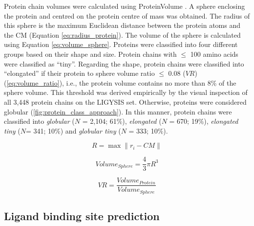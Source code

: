 Protein chain volumes were calculated using ProteinVolume \cite{CHEN_2015_PROTEINVOLUME}. A sphere enclosing the protein and centred on the protein centre of mass was obtained. The radius of this sphere is the maximum Euclidean distance between the protein atoms and the CM (Equation \ref{eq:radius_protein}). The volume of the sphere is calculated using Equation \ref{eq:volume_sphere}. Proteins were classified into four different groups based on their shape and size. Protein chains with $\leq$ 100 amino acids were classified as ``tiny''. Regarding the shape, protein chains were classified into ``elongated'' if their protein to sphere volume ratio $\leq$ 0.08 ($VR$) (\autoref{eq:volume_ratio}), i.e., the protein volume contains no more than 8\% of the sphere volume. This threshold was derived empirically by the visual inspection of all 3,448 protein chains on the LIGYSIS set. Otherwise, proteins were considered globular (\autoref{fig:protein_class_approach}). In this manner, protein chains were classified into \textit{globular} ($N$ = 2,104; 61\%), \textit{elongated} ($N$ = 670; 19\%), \textit{elongated tiny} ($N$= 341; 10\%) and \textit{globular tiny} ($N$ = 333; 10\%).

\begin{equation}
R = \max \| r_i - CM \|
\label{eq:radius_protein}
\end{equation}

\begin{equation}
Volume_{Sphere} = \frac{4}{3} \pi R^3
\label{eq:volume_sphere}
\end{equation}

\begin{equation}
VR = \frac{Volume_{Protein}}{Volume_{Sphere}}
\label{eq:volume_ratio}
\end{equation}

\FloatBarrier

\subsection{Ligand binding site prediction}

